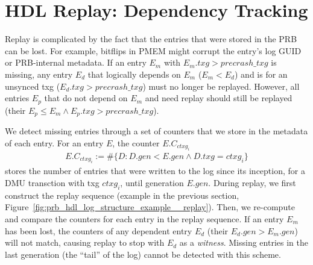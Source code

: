 \documentclass[12pt,a4paper,twoside]{book}
\begin{document}
\section{HDL Replay: Dependency Tracking}\label{di:prb:deptrack}
Replay is complicated by the fact that the entries that were stored in the PRB can be lost.
For example, bitflips in PMEM might corrupt the entry's log GUID or PRB-internal metadata.
If an entry $E_m$ with $E_m.txg > precrash\_txg$ is missing, any entry $E_d$ that logically depends on $E_m$ ($E_m < E_d$) and is for an unsynced txg ($E_d.txg > precrash\_txg$) must no longer be replayed.
However, all entries $E_p$ that do not depend on $E_m$ and need replay should still be replayed (their $E_p \le E_m \wedge E_p.txg > precrash\_txg$).

We detect missing entries through a set of counters that we store in the metadata of each entry.
For an entry $E$, the counter $E.C_{ctxg_i}$
\begin{gather*}
    E.C_{ctxg_i} := \#\{ D : D.gen < E.gen \wedge D.txg = ctxg_i\}
\end{gather*}
stores the number of entries that were written to the log since its inception, for a DMU transction with txg $ctxg_i$, until generation $E.gen$.
During replay, we first construct the replay sequence (example in the previous section, Figure~\ref{fig:prb_hdl_log_structure_example__replay}).
Then, we re-compute and compare the counters for each entry in the replay sequence.
If an entry $E_m$ has been lost, the counters of any dependent entry $E_d$ (their $E_d.gen > E_m.gen$) will not match, causing replay to stop with $E_d$ as a \textit{witness}.
Missing entries in the last generation (the ``tail'' of the log) cannot be detected with this scheme.
\end{document}
